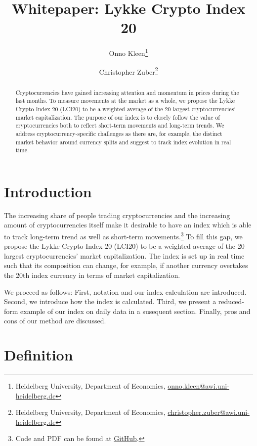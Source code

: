 \documentclass[11pt]{article}
\title{Whitepaper: Lykke Crypto Index 20}
\author{
Onno Kleen\thanks{Heidelberg University, Department of Economics, \href{mailto:onno.kleen@awi.uni-heidelberg.de}{onno.kleen@awi.uni-heidelberg.de}}
\and
Christopher Zuber\thanks{Heidelberg University, Department of Economics, \href{mailto:christopher.zuber@awi.uni-heidelberg.de}{christopher.zuber@awi.uni-heidelberg.de}}
}
\begin{document}
\maketitle

\begin{abstract}
    Cryptocurrencies have gained increasing attention and momentum in prices during the last months.
    To measure movements at the market as a whole, we propose the Lykke Crypto Index 20 (LCI20) to be a weighted average of the 20 largest cryptocurrencies' market capitalization.
    The purpose of our index is to closely follow the value of cryptocurrencies both to reflect short-term movements and long-term trends.
    We address cryptocurrency-specific challenges as there are, for example, the distinct market behavior around currency splits and suggest to track index evolution in real time.
\end{abstract}


\section{Introduction}

The increasing share of people trading cryptocurrencies and the increasing amount of cryptocurrencies itself make it desirable to have an index which is able to track long-term trend as well as short-term movements.\footnote{Code and PDF can be found at \href{https://github.com/onnokleen/crypto-index}{GitHub}.}
To fill this gap, we propose the Lykke Crypto Index 20 (LCI20) to be a weighted average of the 20 largest cryptocurrencies' market capitalization.
The index is set up in real time such that its composition can change, for example, if another currency overtakes the 20th index currency in terms of market capitalization.

We proceed as follows:
First, notation and our index calculation are introduced.
Second, we introduce how the index is calculated.
Third, we present a reduced-form example of our index on daily data in a susequent section.
Finally, pros and cons of our method are discussed.


\section{Definition}
\end{document}
